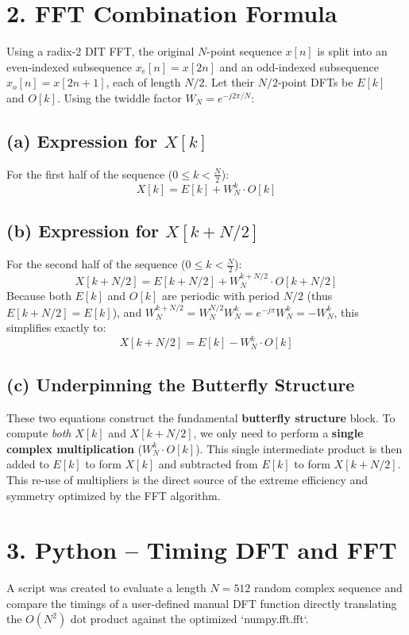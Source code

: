\documentclass[11pt, a4paper]{article}
\begin{document}
\section{2. FFT Combination Formula}
Using a radix-2 DIT FFT, the original $N$-point sequence $x[n]$ is split into an even-indexed subsequence $x_{e}[n] = x[2n]$ and an odd-indexed subsequence $x_{o}[n] = x[2n+1]$, each of length $N/2$. Let their $N/2$-point DFTs be $E[k]$ and $O[k]$. Using the twiddle factor $W_N = e^{-j2\pi/N} $:

\subsection{(a) Expression for $X[k]$}
For the first half of the sequence ($0 \le k < \frac{N}{2}$):
$$ X[k] = E[k] + W_N^k \cdot O[k] $$

\subsection{(b) Expression for $X[k + N/2]$}
For the second half of the sequence ($0 \le k < \frac{N}{2}$):
$$ X[k + N/2] = E[k + N/2] + W_N^{k+N/2} \cdot O[k + N/2] $$
Because both $E[k]$ and $O[k]$ are periodic with period $N/2$ (thus $E[k+N/2] = E[k]$), and $W_N^{k+N/2} = W_N^{N/2} W_N^k = e^{-j\pi} W_N^k = -W_N^k$, this simplifies exactly to:
$$ X[k + N/2] = E[k] - W_N^k \cdot O[k] $$

\subsection{(c) Underpinning the Butterfly Structure}
These two equations construct the fundamental \textbf{butterfly structure} block. To compute \textit{both} $X[k]$ and $X[k+N/2]$, we only need to perform a \textbf{single complex multiplication} ($W_N^k \cdot O[k]$). This single intermediate product is then added to $E[k]$ to form $X[k]$ and subtracted from $E[k]$ to form $X[k+N/2]$. This re-use of multipliers is the direct source of the extreme efficiency and symmetry optimized by the FFT algorithm.

\section{3. Python – Timing DFT and FFT}

A script was created to evaluate a length $N=512$ random complex sequence and compare the timings of a user-defined manual DFT function directly translating the $O(N^2)$ dot product against the optimized `numpy.fft.fft`.
\end{document}
